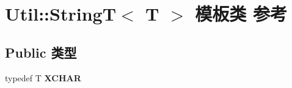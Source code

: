 \hypertarget{class_util_1_1_string_t}{\section{Util\-:\-:String\-T$<$ T $>$ 模板类 参考}
\label{class_util_1_1_string_t}
}
\subsection*{Public 类型}
\begin{DoxyCompactItemize}
\item 
\hypertarget{class_util_1_1_string_t_a120efc2171f8e53732aa4b56d9ba37c6}{typedef T {\bfseries X\-C\-H\-A\-R}}\label{class_util_1_1_string_t_a120efc2171f8e53732aa4b56d9ba37c6}

\end{DoxyCompactItemize}
